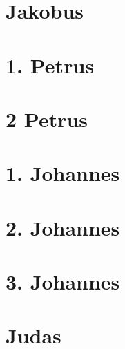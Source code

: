 \chapter{Jakobus}
\begin{multicols}{2}
  \raggedcolumns
  \parskip=0pt \relax
  
\end{multicols}

\chapter{1. Petrus}
\begin{multicols}{2}
  \raggedcolumns
  \parskip=0pt \relax
  
\end{multicols}

\chapter{2 Petrus}
\begin{multicols}{2}
  \raggedcolumns
  \parskip=0pt \relax
  
\end{multicols}

\chapter{1. Johannes}
\begin{multicols}{2}
  \raggedcolumns
  \parskip=0pt \relax
  
\end{multicols}

\chapter{2. Johannes}
\begin{multicols}{2}
  \raggedcolumns
  \parskip=0pt \relax
  
\end{multicols}

\chapter{3. Johannes}
\begin{multicols}{2}
  \raggedcolumns
  \parskip=0pt \relax
  
\end{multicols}

\chapter{Judas}
\begin{multicols}{2}
  \raggedcolumns
  \parskip=0pt \relax
  
\end{multicols}

